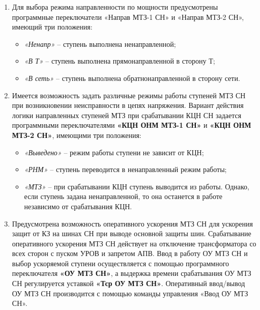 \begin{enumerate}[label=\arabic{section}.\arabic{subsection}.\arabic*,  align=left, labelsep=4pt, leftmargin=0pt, itemindent=57pt]
\begin{figure}[H]
\caption{Функциональная схема ОНМ МТЗ СН}
\label{pict_mtz:ONM_MTZ_SN}
\end{figure}

\item
Для выбора режима направленности по мощности предусмотрены программные переключатели
«Направ МТЗ-1 СН» и «Направ МТЗ-2 СН», имеющий три положения:
\begin{itemize}
\item \textit{«Ненапр»} -- ступень выполнена ненаправленной;
\item \textit{«В Т»} -- ступень выполнена прямонаправленной в сторону Т;
\item \textit{«В сеть»} -- ступень выполнена обратнонаправленной в сторону сети.
\end{itemize}

\item
Имеется возможность задать различные режимы работы ступеней МТЗ СН при возникновении
неисправности в цепях напряжения. Вариант действия логики направленных ступеней МТЗ при срабатывании
КЦН СН задается программными переключателями \textbf{«КЦН ОНМ МТЗ-1 СН»} и \textbf{«КЦН ОНМ МТЗ-2 СН»},
имеющими три положения:
\begin{itemize}
\item \textit{«Выведено»} -- режим работы ступени не зависит от КЦН;
\item \textit{«РНМ»} -- ступень переводится в ненаправленный режим работы;
\item \textit{«МТЗ»} -- при срабатывании КЦН ступень выводится из работы. Однако, если ступень задана ненаправленной, то она останется в работе независимо от срабатывания КЦН. 
\end{itemize}

\item
Предусмотрена возможность оперативного ускорения МТЗ СН для ускорения защит от КЗ на шинах СН
при выводе основной защиты шин. Срабатывание оперативного ускорения МТЗ СН действует на отключение
трансформатора со всех сторон с пуском УРОВ и запретом АПВ. Ввод в работу ОУ МТЗ СН и выбор ускоряемой
ступени осуществляется с помощью программного переключателя \textbf{«ОУ МТЗ СН»}, а выдержка времени
срабатывания ОУ МТЗ СН регулируется уставкой \textbf{«Тср ОУ МТЗ СН»}. Оперативный ввод/вывод ОУ МТЗ СН
производится с помощью команды управления «Ввод ОУ МТЗ СН». 


\end{enumerate}
